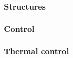 \subsubsection{Structures}\label{subsec:struct}
\subsubsection{Control}\label{subsec:control}

\subsubsection{Thermal control}\label{subsec:therm}

